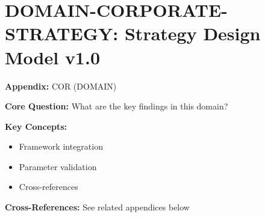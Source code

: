 
\chapter{DOMAIN-CORPORATE-STRATEGY: Strategy Design Model v1.0}
\label{app:sdm}


\begin{tcolorbox}[colback=blue!5!white, colframe=blue!75!black,
    title=Quick Reference: Appendix UNMAPPED_COR]

\textbf{Appendix:} COR (DOMAIN)

\textbf{Core Question:} What are the key findings in this domain?

\textbf{Key Concepts:}
\begin{itemize}[nosep]
\item Framework integration
\item Parameter validation
\item Cross-references
\end{itemize}

\textbf{Cross-References:} See related appendices below
\end{tcolorbox}


\begin{abstract}
This appendix presents the Strategy Design Model v1.0 (SDM), a process-based framework for designing comprehensive corporate strategies using the EBF hybrid methodology. SDM models strategic transformation as a four-phase behavioral change journey (Awareness-Readiness-Action-Embedding) over 3-5 years, integrating five context dimensions ($\Psi$), five strategic utility dimensions (Financial, Environmental, Practical, Strategic, Deliberative), and seven complementarity parameters ($\gamma$). The model uses Behavioral Change Journey (BCJ) mathematics to predict strategy adoption probability and outcome distributions across organizational change phases. SDM is designed for large organizations facing market transformation and serves as the bridge between EBF theory and organizational practice.
\end{abstract}


